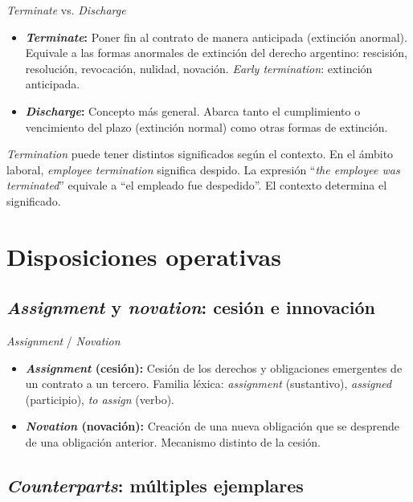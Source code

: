 \documentclass[12pt,oneside]{book}
\begin{document}
\begin{definition}{\textit{Terminate} vs. \textit{Discharge}}
\begin{itemize}
    \item \textbf{\textit{Terminate}:} Poner fin al contrato de manera anticipada (extinción anormal). Equivale a las formas anormales de extinción del derecho argentino: rescisión, resolución, revocación, nulidad, novación. \textit{Early termination}: extinción anticipada.
    \item \textbf{\textit{Discharge}:} Concepto más general. Abarca tanto el cumplimiento o vencimiento del plazo (extinción normal) como otras formas de extinción.
\end{itemize}
\end{definition}

\begin{note}
\textit{Termination} puede tener distintos significados según el contexto. En el ámbito laboral, \textit{employee termination} significa despido. La expresión ``\textit{the employee was terminated}'' equivale a ``el empleado fue despedido''. El contexto determina el significado.
\end{note}

\section{Disposiciones operativas}

\subsection{\textit{Assignment} y \textit{novation}: cesión e innovación}

\begin{definition}{\textit{Assignment} / \textit{Novation}}
\begin{itemize}
    \item \textbf{\textit{Assignment} (cesión):} Cesión de los derechos y obligaciones emergentes de un contrato a un tercero. Familia léxica: \textit{assignment} (sustantivo), \textit{assigned} (participio), \textit{to assign} (verbo).
    \item \textbf{\textit{Novation} (novación):} Creación de una nueva obligación que se desprende de una obligación anterior. Mecanismo distinto de la cesión.
\end{itemize}
\end{definition}

\subsection{\textit{Counterparts}: múltiples ejemplares}
\end{document}

